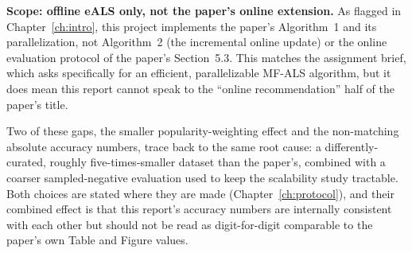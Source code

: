 \medskip
\textbf{Scope: offline eALS only, not the paper's online extension.} As
flagged in Chapter~\ref{ch:intro}, this project implements the paper's
Algorithm~1 and its parallelization, not Algorithm~2 (the incremental
online update) or the online evaluation protocol of the paper's
Section~5.3. This matches the assignment brief, which asks specifically
for an efficient, parallelizable MF-ALS algorithm, but it does mean this
report cannot speak to the ``online recommendation'' half of the paper's
title.

\medskip
Two of these gaps, the smaller popularity-weighting effect and the
non-matching absolute accuracy numbers, trace back to the same root
cause: a differently-curated, roughly five-times-smaller dataset than the
paper's, combined with a coarser sampled-negative evaluation used to keep
the scalability study tractable. Both choices are stated where they are
made (Chapter~\ref{ch:protocol}), and their combined effect is that this
report's accuracy numbers are internally consistent with each other but
should not be read as digit-for-digit comparable to the paper's own Table
and Figure values.
